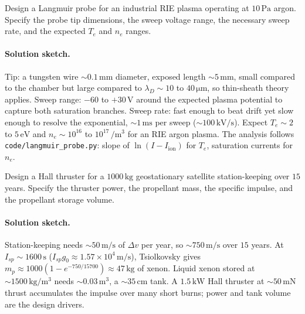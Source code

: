 \begin{exercise}
Design a Langmuir probe for an industrial RIE plasma operating at
$10\,\si{\pascal}$ argon. Specify the probe tip dimensions, the
sweep voltage range, the necessary sweep rate, and the expected
$T_{e}$ and $n_{e}$ ranges.
\paragraph{Solution sketch.} Tip: a tungsten wire $\sim 0.1\,\si{\milli
\meter}$ diameter, exposed length $\sim 5\,\si{\milli\meter}$, small
compared to the chamber but large compared to $\lambda_{D}\sim 10$ to
$40\,\si{\micro\meter}$, so thin-sheath theory applies. Sweep range:
$-60$ to $+30\,\si{\volt}$ around the expected plasma potential to capture
both saturation branches. Sweep rate: fast enough to beat drift yet slow
enough to resolve the exponential, $\sim 1\,\si{\milli\second}$ per sweep
($\sim 100\,\si{\kilo\volt\per\second}$). Expect $T_{e}\sim 2$ to
$5\,\si{\electronvolt}$ and $n_{e}\sim 10^{16}$ to $10^{17}\,\si{\per
\cubic\meter}$ for an RIE argon plasma. The analysis follows
\texttt{code/langmuir\_probe.py}: slope of $\ln(I-I_{\mathrm{ion}})$ for
$T_{e}$, saturation currents for $n_{e}$.
\end{exercise}

\begin{exercise}
Design a Hall thruster for a $1000\,\si{\kilo\gram}$ geostationary
satellite station-keeping over $15$ years. Specify the thruster
power, the propellant mass, the specific impulse, and the propellant
storage volume.
\paragraph{Solution sketch.} Station-keeping needs $\sim 50\,\si{\meter
\per\second}$ of $\Delta v$ per year, so $\sim 750\,\si{\meter\per\second}$
over $15$ years. At $I_{sp}\sim 1600\,\si{\second}$ ($I_{sp}g_{0}\approx
1.57\times 10^{4}\,\si{\meter\per\second}$), Tsiolkovsky gives $m_{p}
\approx 1000(1 - e^{-750/15700}) \approx 47\,\si{\kilogram}$ of xenon.
Liquid xenon stored at $\sim 1500\,\si{\kilogram\per\cubic\meter}$ needs
$\sim 0.03\,\si{\meter\cubed}$, a $\sim 35\,\si{\centi\meter}$ tank.
A $1.5\,\si{\kilo\watt}$ Hall thruster at $\sim 50\,\si{\milli\newton}$
thrust accumulates the impulse over many short burns; power and tank
volume are the design drivers.
\end{exercise}

